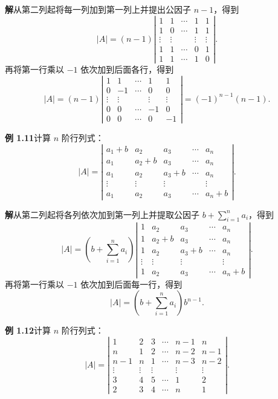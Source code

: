 \documentclass[UTF8, 12pt, fontset=fandol, oneside]{ctexart}
\begin{document}
\noindent\textbf{解}\quad 从第二列起将每一列加到第一列上并提出公因子 $n-1$，得到
\[
|A|=(n-1)
\left|\begin{array}{ccccc}
1 & 1 & \cdots & 1 & 1\\
1 & 0 & \cdots & 1 & 1\\
\vdots & \vdots &        & \vdots & \vdots\\
1 & 1 & \cdots & 0 & 1\\
1 & 1 & \cdots & 1 & 0
\end{array}\right|.
\]
再将第一行乘以 $-1$ 依次加到后面各行，得到
\[
|A|=(n-1)
\left|\begin{array}{ccccc}
1 & 1 & \cdots & 1 & 1\\
0 & -1 & \cdots & 0 & 0\\
\vdots & \vdots &        & \vdots & \vdots\\
0 & 0 & \cdots & -1 & 0\\
0 & 0 & \cdots & 0 & -1
\end{array}\right|
=(-1)^{n-1}(n-1).
\]

\noindent\textbf{例 1.11}\quad 计算 $n$ 阶行列式：
\[
|A|=\left|\begin{array}{ccccc}
a_1+b & a_2 & a_3 & \cdots & a_n\\
a_1 & a_2+b & a_3 & \cdots & a_n\\
a_1 & a_2 & a_3+b & \cdots & a_n\\
\vdots & \vdots & \vdots &        & \vdots\\
a_1 & a_2 & a_3 & \cdots & a_n+b
\end{array}\right|.
\]

\noindent\textbf{解}\quad 从第二列起将各列依次加到第一列上并提取公因子 $b+\sum_{i=1}^n a_i$，得到
\[
|A|=\left(b+\sum_{i=1}^n a_i\right)
\left|\begin{array}{ccccc}
1 & a_2 & a_3 & \cdots & a_n\\
1 & a_2+b & a_3 & \cdots & a_n\\
1 & a_2 & a_3+b & \cdots & a_n\\
\vdots & \vdots & \vdots &        & \vdots\\
1 & a_2 & a_3 & \cdots & a_n+b
\end{array}\right|.
\]
再将第一行乘以 $-1$ 依次加到后面每一行，得到
\[
|A|=\left(b+\sum_{i=1}^n a_i\right)b^{n-1}.
\]

\noindent\textbf{例 1.12}\quad 计算 $n$ 阶行列式：
\[
|A|=\left|\begin{array}{cccccc}
1 & 2 & 3 & \cdots & n-1 & n\\
n & 1 & 2 & \cdots & n-2 & n-1\\
n-1 & n & 1 & \cdots & n-3 & n-2\\
\vdots & \vdots & \vdots &        & \vdots & \vdots\\
3 & 4 & 5 & \cdots & 1 & 2\\
2 & 3 & 4 & \cdots & n & 1
\end{array}\right|.
\]
\end{document}
